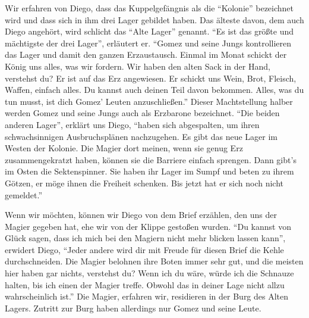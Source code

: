 \documentclass[a5paper,pagesize,numbers=noenddot]{scrbook}
\begin{document}
Wir erfahren von Diego, dass das Kuppelgefängnis als die \enquote{Kolonie} bezeichnet wird und dass sich in ihm drei Lager gebildet haben.
Das älteste davon, dem auch Diego angehört, wird schlicht das \enquote{Alte Lager} genannt.
\enquote{Es ist das größte und mächtigste der drei Lager}, erläutert er.
\enquote{Gomez und seine Jungs kontrollieren das Lager und damit den ganzen Erzaustausch.
Einmal im Monat schickt der König uns alles, was wir fordern.
Wir haben den alten Sack in der Hand, verstehst du?
Er ist auf das Erz angewiesen.
Er schickt uns Wein, Brot, Fleisch, Waffen, einfach alles.
Du kannst auch deinen Teil davon bekommen.
Alles, was du tun musst, ist dich Gomez' Leuten anzuschließen.}
Dieser Machtstellung halber werden Gomez und seine Jungs auch als Erzbarone bezeichnet.
\enquote{Die beiden anderen Lager}, erklärt uns Diego, \enquote{haben sich abgespalten, um ihren schwachsinnigen Ausbruchsplänen nachzugehen.
Es gibt das neue Lager im Westen der Kolonie.
Die Magier dort meinen, wenn sie genug Erz zusammengekratzt haben, können sie die Barriere einfach sprengen.
Dann gibt's im Osten die Sektenspinner.
Sie haben ihr Lager im Sumpf und beten zu ihrem Götzen, er möge ihnen die Freiheit schenken.
Bis jetzt hat er sich noch nicht gemeldet.}

Wenn wir möchten, können wir Diego von dem Brief erzählen, den uns der Magier gegeben hat, ehe wir von der Klippe gestoßen wurden.
\enquote{Du kannst von Glück sagen, dass ich mich bei den Magiern nicht mehr blicken lassen kann}, erwidert Diego, \enquote{Jeder andere wird dir mit Freude für diesen Brief die Kehle durchschneiden.
Die Magier belohnen ihre Boten immer sehr gut, und die meisten hier haben gar nichts, verstehst du?
Wenn ich du wäre, würde ich die Schnauze halten, bis ich einen der Magier treffe.
Obwohl das in deiner Lage nicht allzu wahrscheinlich ist.}
Die Magier, erfahren wir, residieren in der Burg des Alten Lagers.
Zutritt zur Burg haben allerdings nur Gomez und seine Leute.
\end{document}
